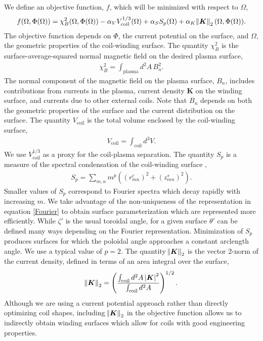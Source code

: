 \documentclass[aps,unsortedaddress]{revtex4-1}
\begin{document}
We define an objective function, $f$, which will be minimized with respect to $\Omega$,
\begin{gather}
f(\Omega, \Phi(\Omega))  = \chi^2_B(\Omega, \Phi(\Omega)) - \alpha_V V_{\text{coil}}^{1/3}(\Omega) + \alpha_S S_p(\Omega) + \alpha_K  \norm{\bm{K}}_2(\Omega, \Phi(\Omega)).
\label{objective_function}
\end{gather}
The objective function depends on $\Phi$, the current potential on the surface, and $\Omega$, the geometric properties of the coil-winding surface. The quantity $\chi^2_B$ is the surface-average-squared normal magnetic field on the desired plasma surface,
\begin{gather}
\chi^2_B = \int_{\text{plasma}} d^2 A \, B_n^2.
\label{chi2_B}
\end{gather}
The normal component of the magnetic field on the plasma surface, $B_n$, includes contributions from currents in the plasma, current density $\bm{K}$ on the winding surface, and currents due to other external coils. Note that $B_n$ depends on both the geometric properties of the surface and the current distribution on the surface. The quantity $V_{\text{coil}}$ is the total volume enclosed by the coil-winding surface,
\begin{gather}
V_{\text{coil}} = \int_{\text{coil}} d^3 V.
\end{gather}
We use $V_{\text{coil}}^{1/3}$ as a proxy for the coil-plasma separation. The quantity $S_p$ is a measure of the spectral condensation of the coil-winding surface \cite{Hirshman1985},
\begin{gather}
S_p = \sum_{m,n} m^{p} \left( (r_{mn}^c)^2 + (z_{mn}^s)^2 \right).
\end{gather}
Smaller values of $S_p$ correspond to Fourier spectra which decay rapidly with increasing $m$. We take advantage of the non-uniqueness of the representation in equation \ref{Fourier} to obtain surface parameterization which are represented more efficiently. While $\zeta'$ is the usual toroidal angle, for a given surface $\theta'$ can be defined many ways depending on the Fourier representation.
Minimization of $S_p$ produces surfaces for which the poloidal angle approaches a constant arclength angle. We use a typical value of $p=2$. The quantity $\norm{\bm{K}}_2$ is the vector 2-norm of the current density, defined in terms of an area integral over the surface,
\begin{gather}
\norm{\bm{K}}_2 = \left( \frac{\int_{\text{coil}} d^2 A \, \abs{\bm{K}}^2}{\int_{\text{coil}} d^2 A}  \right)^{1/2}.
\end{gather}
Although we are using a current potential approach rather than directly optimizing coil shapes, including $\norm{\bm{K}}_2$ in the objective function allows us to indirectly obtain winding surfaces which allow for coils with good engineering properties. 
\end{document}
